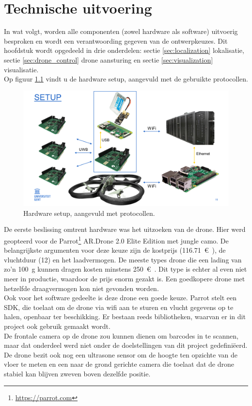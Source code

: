 \chapter{Technische uitvoering}
In wat volgt, worden alle componenten (zowel hardware als software) uitvoerig besproken en wordt een verantwoording gegeven van de ontwerpkeuzes.
Dit hoofdstuk wordt opgedeeld in drie onderdelen: sectie \ref{sec:localization} lokalisatie, sectie \ref{sec:drone_control} drone aansturing en sectie \ref{sec:visualization} visualisatie.\\

Op figuur \ref{fig:setup} vindt u de hardware setup, aangevuld met de gebruikte protocollen.\\
\begin{figure}[p]
	\centering
	\includegraphics[width=\textwidth]{Setup}
	\caption[Setup]{Hardware setup, aangevuld met protocollen.}
	\label{fig:setup}
\end{figure}

De eerste beslissing omtrent hardware was het uitzoeken van de drone.
Hier werd geopteerd voor de Parrot\footnote{\url{https://parrot.com}} AR.Drone 2.0 Elite Edition met jungle camo.
De belangrijkste argumenten voor deze keuze zijn de kostprijs (\SI{116.71}{\euro{}}), de vluchtduur (\SI{12}{\min}) en het laadvermogen. De meeste types drone die een lading van zo'n \SI{100}{\g} kunnen dragen kosten minstens \SI{250}{\euro{}}. Dit type is echter al even niet meer in productie, waardoor de prijs enorm gezakt is. Een goedkopere drone met hetzelfde draagvermogen kon niet gevonden worden.\\
Ook voor het software gedeelte is deze drone een goede keuze. Parrot stelt een SDK, die toelaat om de drone via wifi aan te sturen en vlucht gegevens op te halen, openbaar ter beschikking.
Er bestaan reeds bibliotheken, waarvan er in dit project ook gebruik gemaakt wordt.\\
De frontale camera op de drone zou kunnen dienen om barcodes in te scannen, maar dat onderdeel werd niet onder de doelstellingen van dit project gedefini\"eerd. De drone bezit ook nog een ultrasone sensor om de hoogte ten opzichte van de vloer te meten en een naar de grond gerichte camera die toelaat dat de drone stabiel kan blijven zweven boven dezelfde positie.\\

